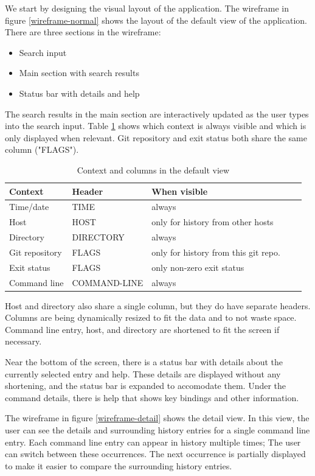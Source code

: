 We start by designing the visual layout of the application.
The wireframe in figure \ref{wireframe-normal} shows the layout of the default view of the application. There are three sections in the wireframe:

\begin{itemize}
\item Search input
\item Main section with search results
\item Status bar with details and help
\end{itemize}




The search results in the main section are interactively updated as the user types into the search input. Table \ref{tab:design-columns} shows which context is always visible and which is only displayed when relevant. Git repository and exit status both share the same column ("FLAGS"). 

\begin{table}[h]
\centering
\begin{tabular}{lllll}
\hline \hline
Context & Header & When visible \\\hline
Time/date & TIME & always \\ 
Host & HOST & only for history from other hosts \\ 
Directory & DIRECTORY & always \\ 
Git repository & FLAGS & only for history from this git repo. \\ 
Exit status & FLAGS & only non-zero exit status \\ 
Command line & COMMAND-LINE & always \\\hline \hline
\end{tabular}
\caption{Context and columns in the default view}
\label{tab:design-columns}
\end{table}

Host and directory also share a single column, but they do have separate headers. Columns are being dynamically resized to fit the data and to not waste space. Command line entry, host, and directory are shortened to fit the screen if necessary. 

Near the bottom of the screen, there is a status bar with details about the currently selected entry and help. These details are displayed without any shortening, and the status bar is expanded to accomodate them. Under the command details, there is help that shows key bindings and other information.


The wireframe in figure \ref{wireframe-detail} shows the detail view. In this view, the user can see the details and surrounding history entries for a single command line entry. Each command line entry can appear in history multiple times; The user can switch between these occurrences. The next occurrence is partially displayed to make it easier to compare the surrounding history entries.


